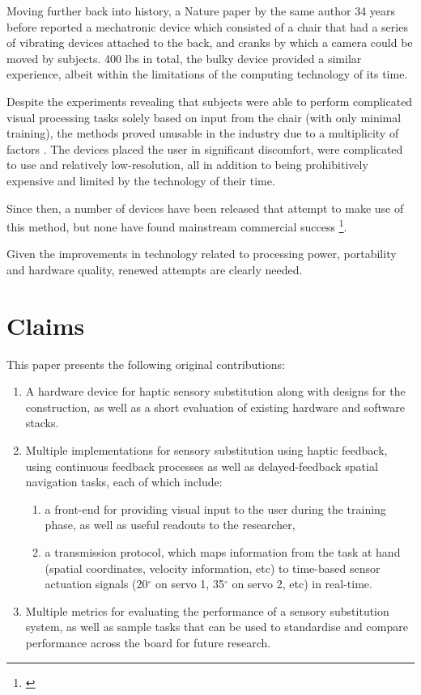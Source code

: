 \documentclass[
hidelinks,
12pt, %
oneside, %
english, %
doublespacing, %
headsepline, %
]{MastersDoctoralThesis} %
\begin{document}
Moving further back into history, a Nature paper \parencite{white_vision_1969} by the same author 34 years before reported a mechatronic device which consisted of a chair that had a series of vibrating devices attached to the back, and cranks by which a camera could be moved by subjects. 400 lbs in total, the bulky device provided a similar experience, albeit within the limitations of the computing technology of its time.

Despite the experiments revealing that subjects were able to perform complicated visual processing tasks solely based on input from the chair (with only minimal training), the methods proved unusable in the industry due to a multiplicity of factors \parencite{phillips_predictors_1993}. The devices placed the user in significant discomfort, were complicated to use and relatively low-resolution, all in addition to being prohibitively expensive and limited by the technology of their time.

Since then, a number of devices \parencite{noauthor_brainport_nodate} have been released that attempt to make use of this method, but none have found mainstream commercial success \footnote{\parencite{se_perception_nodate}}.

Given the improvements in technology related to processing power, portability and hardware quality, renewed attempts are clearly needed.

\section{Claims}

This paper presents the following original contributions:

\begin{enumerate}
	\item A hardware device for haptic sensory substitution along with designs for the construction, as well as a short evaluation of existing hardware and software stacks.
	\item Multiple implementations for sensory substitution using haptic feedback, using continuous feedback processes as well as delayed-feedback spatial navigation tasks, each of which include:
		\begin{enumerate}
			\item a front-end for providing visual input to the user during the training phase, as
		 	well as useful readouts to the researcher,
			\item a transmission protocol, which maps information from the task at hand (spatial coordinates, velocity information, etc) to time-based sensor actuation signals (20$^{\circ}$ on servo 1, 35$^{\circ}$ on servo 2, etc) in real-time.
		\end{enumerate}
	\item Multiple metrics for evaluating the performance of a sensory substitution system, as well as sample tasks that can be used to standardise and compare performance across the board for future research.
\end{enumerate}
\end{document}
